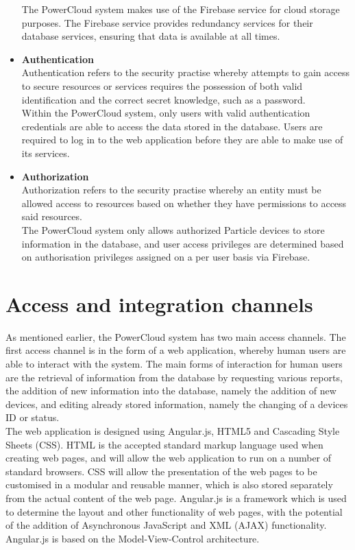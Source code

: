 \documentclass{article}
\begin{document}
\begin{itemize}
		The PowerCloud system makes use of the Firebase service for cloud 
		storage purposes. The Firebase service provides redundancy services for 
		their database services, ensuring that data is available at all times.

		\item \textbf{Authentication}\\
		Authentication refers to the security practise whereby attempts to gain 
		access to secure resources or services requires the possession of both 
		valid identification and the correct secret knowledge, such as a 
		password.\\
		
		Within the PowerCloud system, only users with valid authentication 
		credentials are able to access the data stored in the database. Users 
		are required to log in to the web application before they are able to 
		make use of its services.
		
		\item \textbf{Authorization}\\
		Authorization refers to the security practise whereby an entity must be 
		allowed access to resources based on whether they have permissions to 
		access said resources.\\
		
		The PowerCloud system only allows authorized Particle devices to store 
		information in the database, and user access privileges are determined 
		based on authorisation privileges assigned on a per user basis via 
		Firebase.
	\end{itemize}

\newpage

\section{Access and integration channels}
	
	As mentioned earlier, the PowerCloud system has two main access 
	channels. The first access channel is in the form of a web 
	application, whereby human users are able to interact with the 
	system. The main forms of interaction for human users are the 
	retrieval of information from the database by requesting various 
	reports, the addition of new information into the database, namely 
	the addition of new devices, and editing already stored information, 
	namely the changing of a devices ID or status.\\
	
	The web application is designed using Angular.js, HTML5 and Cascading 
	Style Sheets (CSS). HTML is the accepted standard markup language 
	used when creating web pages, and will allow the web application to 
	run on a number of standard browsers. CSS will allow the presentation 
	of the web pages to be customised in a modular and reusable manner, 
	which is also stored separately from the actual content of the web 
	page. Angular.js is a framework which is used to determine the layout 
	and other functionality of web pages, with the potential of the 
	addition of Asynchronous JavaScript and XML (AJAX) functionality. 
	Angular.js is based on the Model-View-Control architecture.\\
	
\end{document}
